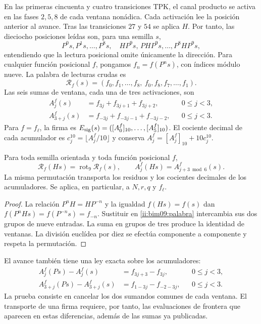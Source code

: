 En las primeras cincuenta y cuatro transiciones TPK, el canal producto
se activa en las fases $2,5,8$ de cada ventana nonádica. Cada activación
lee la posición anterior al avance. Tras las transiciones $27$ y $54$
se aplica $H$. Por tanto, las dieciocho posiciones leídas son, para una
semilla $s$,
\[
 P^0s,P^1s,\ldots,P^8s,\quad
 HP^9s,\,P H P^9s,\ldots,P^8H P^9s,
\]
entendiendo que la lectura posicional omite únicamente la dirección.
Para cualquier función posicional $f$, pongamos $f_n=f(P^ns)$, con
índices módulo nueve. La palabra de lecturas crudas es
\begin{equation}
 \mathcal R_f(s)=
 (f_0,f_1,\ldots,f_8,\ f_0,f_8,f_7,\ldots,f_1).
 \label{ii:bim09:palabra}
\end{equation}
Las seis sumas de ventana, cada una de tres activaciones, son
\begin{align}
 A_j^f(s)&=f_{3j}+f_{3j+1}+f_{3j+2},&&0\leq j<3,\label{ii:bim09:ida}\\
 A_{3+j}^f(s)&=f_{-3j}+f_{-3j-1}+f_{-3j-2},&&0\leq j<3.
 \label{ii:bim09:vuelta}
\end{align}
Para $f=f_\ell$, la firma es
$E_{\rm sig}(s)=([A_0^f]_{10},\ldots,[A_5^f]_{10})$.
El cociente decimal de cada acumulador es
$c_j^{10}=\lfloor A_j^f/10\rfloor$ y conserva
$A_j^f=[A_j^f]_{10}+10c_j^{10}$.

\begin{proposition}
\label{ii:bim09:media-vuelta}
Para toda semilla orientada y toda función posicional $f$,
\[
 \mathcal R_f(Hs)=\operatorname{rot}_9\mathcal R_f(s),\qquad
 A_j^f(Hs)=A_{j+3\bmod6}^f(s).
\]
La misma permutación transporta los residuos y los cocientes decimales
de los acumuladores. Se aplica, en particular, a $N,r,q$ y $f_\ell$.
\end{proposition}
\begin{proof}
La relación $P^nH=HP^{-n}$ y la igualdad $f(Hs)=f(s)$ dan
$f(P^nHs)=f(P^{-n}s)=f_{-n}$. Sustituir en
\eqref{ii:bim09:palabra} intercambia sus dos grupos de nueve entradas.
La suma en grupos de tres produce la identidad de ventanas. La división
euclídea por diez se efectúa componente a componente y respeta la
permutación.
\end{proof}

El avance también tiene una ley exacta sobre los acumuladores:
\begin{align}
 A_j^f(Ps)-A_j^f(s)&=f_{3j+3}-f_{3j},&&0\leq j<3,
 \label{ii:bim09:avance-ida}\\
 A_{3+j}^f(Ps)-A_{3+j}^f(s)&=f_{1-3j}-f_{-2-3j},&&0\leq j<3.
 \label{ii:bim09:avance-vuelta}
\end{align}
La prueba consiste en cancelar los dos sumandos comunes de cada ventana.
El transporte de una firma requiere, por tanto, las evaluaciones de
frontera que aparecen en estas diferencias, además de las sumas ya
publicadas.

